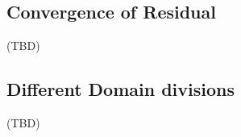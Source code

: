		\subsection{Convergence of Residual}
		(TBD)

		\subsection{Different Domain divisions}
		(TBD)

%
%
%
%
%
%
%
